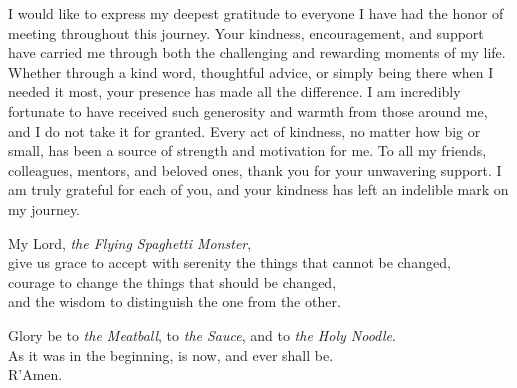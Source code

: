 \documentclass[11pt, a4paper, onecolumn, oneside]{report}
\begin{document}
        I would like to express my deepest gratitude to everyone I have had the honor of meeting throughout this journey. Your kindness, encouragement, and support have carried me through both the challenging and rewarding moments of my life. Whether through a kind word, thoughtful advice, or simply being there when I needed it most, your presence has made all the difference. I am incredibly fortunate to have received such generosity and warmth from those around me, and I do not take it for granted. Every act of kindness, no matter how big or small, has been a source of strength and motivation for me. To all my friends, colleagues, mentors, and beloved ones, thank you for your unwavering support. I am truly grateful for each of you, and your kindness has left an indelible mark on my journey.

        \begin{center}
            My Lord, \textit{the Flying Spaghetti Monster},\\
            give us grace to accept with serenity the things that cannot be changed,\\
            courage to change the things that should be changed,\\
            and the wisdom to distinguish the one from the other.

            \medspace

            Glory be to \textit{the Meatball}, to \textit{the Sauce}, and to \textit{the Holy Noodle}. \\
            As it was in the beginning, is now, and ever shall be. \\
            R'Amen.
        \end{center}
    \clearpage

\hbox{ }
\thispagestyle{empty}
\clearpage
\end{document}
